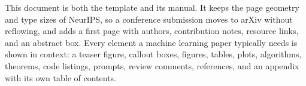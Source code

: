 This document is both the template and its manual. It keeps the page geometry and type sizes of NeurIPS, so a conference submission moves to arXiv without reflowing, and adds a first page with authors, contribution notes, resource links, and an abstract box. Every element a machine learning paper typically needs is shown in context: a teaser figure, callout boxes, figures, tables, plots, algorithms, theorems, code listings, prompts, review comments, references, and an appendix with its own table of contents.
